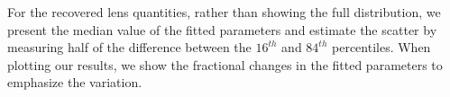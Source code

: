 For the recovered lens quantities, rather than showing the full distribution, we present the median value of the fitted parameters and estimate the scatter by measuring half of the difference between the $16^{th}$ and $84^{th}$ percentiles. When plotting our results, we show the fractional changes in the fitted parameters to emphasize the variation.